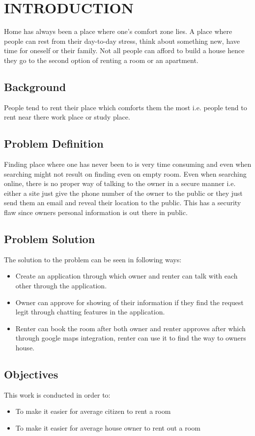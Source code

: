 \chapter{INTRODUCTION}
Home has always been a place where one’s comfort zone lies. A place where people can rest from their day-to-day stress, think about something new, have time for oneself or their family. Not all people can afford to build a house hence they go to the second option of renting a room or an apartment.

\section{Background }
 People tend to rent their place which comforts them the most i.e. people tend to rent near there work place or study place.

\section{Problem Definition}
 Finding place where one has never been to is very time consuming and even when searching might not result on finding even on empty room. Even when searching online, there is no proper way of talking to the owner in a secure manner i.e. either a site just give the phone number of the owner to the public or they just send them an email and reveal their location to the public. This has a security flaw since owners personal information is out there in public.
\section{Problem Solution}
 The solution to the problem can be seen in following ways:
 \begin{itemize}
 	\item Create an application through which owner and renter can talk with each other through the application.
 	\item Owner can approve for showing of their information if they find the request legit through chatting features in the application.
 	\item Renter can book the room after both owner and renter approves after which through google maps integration, renter can use it to find the way to owners house.
 \end{itemize}
\section{Objectives}
This work is conducted in order to: 
\begin{itemize}
  \item To make it easier for average citizen to rent a room
  \item To make it easier for average house owner to rent out a room
   
\end{itemize}
